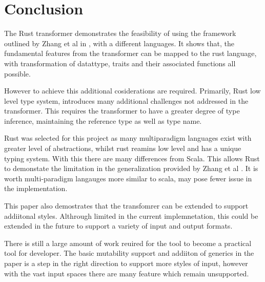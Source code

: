 \documentclass[ oneside,%
                    author={James Elgar},
                    degree={MEng},
                     title={Bidirectional transformer between functional and \\ object-oriented programming in Rust},
                  subtitle={}]{dissertation}
\newcommand{\weixin}{Zhang et al }
\begin{document}

\chapter{Conclusion}
\label{chap:conclusion}

The Rust transformer demonstrates the feasibility of using the framework outlined by \weixin in \cite{food}, with a different languages. It shows that, the fundamental features from the transformer can be mapped to the rust language, with transformation of datattype, traits and their associated functions all possible. 

However to achieve this additional cosiderations are required. Primarily, Rust low level type system, introduces many additional challenges not addressed in the \cite{food} transformer. This requires the transformer to have a greater degree of type inference, maintaining the reference type as well as type name.

Rust was selected for this project as many multiparadigm languages exist with greater level of abstractions, whilst rust reamins low level and has a unique typing system. With this there are many differences from Scala. This allows Rust to demonstate the limitation in the generalization provided by 
\weixin. It is worth multi-paradigm langauges more similar to scala, may pose fewer issue in the implementation.

This paper also demostrates that the transfomrer can be extended to support addiitonal styles. Althrough limited in the current implemnetation, this could be extended in the future to support a variety of input and output formats.

There is still a large amount of work reuired for the tool to become a practical tool for developer. The basic mutability support and addiiton of generics in the paper is a step in the right direction to support more styles of input, however with the vast input spaces there are many feature which remain unsupported.

\end{document}
